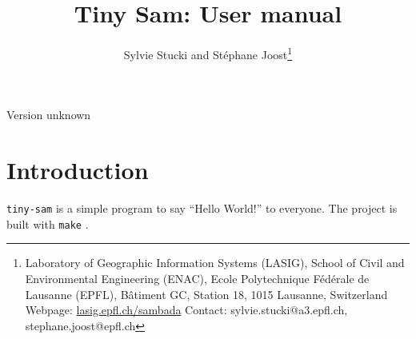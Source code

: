 \documentclass[a4paper,11pt]{article}
\date{ \printdate{\releasedate} }
\title{Tiny Sam: User manual}
\author{Sylvie Stucki and Stéphane Joost\footnote{
Laboratory of Geographic Information Systems (LASIG), School of Civil and Environmental Engineering (ENAC), Ecole Polytechnique Fédérale de Lausanne (EPFL), Bâtiment GC, Station 18, 1015 Lausanne, Switzerland \newline
Webpage: \protect\url{lasig.epfl.ch/sambada} \newline Contact: sylvie.stucki@a3.epfl.ch, stephane.joost@epfl.ch
}}
\newcommand{\versionnumber}{unknown}
\begin{document}
\maketitle

\vspace{-1.25cm}
\begin{center}
\small Version \versionnumber
\end{center}

\vfill

\tableofcontents

\vfill

\clearpage

\section{Introduction}
\texttt{tiny-sam} is a simple program to say ``Hello World!'' to everyone.
The project is built with \texttt{make} \citep{Mecklenburg:2004aa}.
\printbibliography
\end{document}
